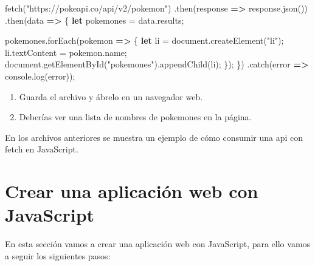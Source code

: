 \documentclass[
  a4paper,
  DIV=11,
  numbers=noendperiod,
  onepage,
  openany]{scrreprt}
\newenvironment{Shaded}{\begin{snugshade}}{\end{snugshade}}
\newcommand{\AttributeTok}[1]{\textcolor[rgb]{0.40,0.45,0.13}{#1}}
\newcommand{\BuiltInTok}[1]{\textcolor[rgb]{0.00,0.23,0.31}{#1}}
\newcommand{\FunctionTok}[1]{\textcolor[rgb]{0.28,0.35,0.67}{#1}}
\newcommand{\KeywordTok}[1]{\textcolor[rgb]{0.00,0.23,0.31}{\textbf{#1}}}
\newcommand{\NormalTok}[1]{\textcolor[rgb]{0.00,0.23,0.31}{#1}}
\newcommand{\OperatorTok}[1]{\textcolor[rgb]{0.37,0.37,0.37}{#1}}
\newcommand{\StringTok}[1]{\textcolor[rgb]{0.13,0.47,0.30}{#1}}
\begin{document}
\begin{tcolorbox}
\begin{Shaded}
\begin{Highlighting}[]
\FunctionTok{fetch}\NormalTok{(}\StringTok{"https://pokeapi.co/api/v2/pokemon"}\NormalTok{)}
    \OperatorTok{.}\FunctionTok{then}\NormalTok{(response }\KeywordTok{=\textgreater{}}\NormalTok{ response}\OperatorTok{.}\FunctionTok{json}\NormalTok{())}
    \OperatorTok{.}\FunctionTok{then}\NormalTok{(data }\KeywordTok{=\textgreater{}}\NormalTok{ \{}
        \KeywordTok{let}\NormalTok{ pokemones }\OperatorTok{=}\NormalTok{ data}\OperatorTok{.}\AttributeTok{results}\OperatorTok{;}

\NormalTok{        pokemones}\OperatorTok{.}\FunctionTok{forEach}\NormalTok{(pokemon }\KeywordTok{=\textgreater{}}\NormalTok{ \{}
            \KeywordTok{let}\NormalTok{ li }\OperatorTok{=} \BuiltInTok{document}\OperatorTok{.}\FunctionTok{createElement}\NormalTok{(}\StringTok{"li"}\NormalTok{)}\OperatorTok{;}
\NormalTok{            li}\OperatorTok{.}\AttributeTok{textContent} \OperatorTok{=}\NormalTok{ pokemon}\OperatorTok{.}\AttributeTok{name}\OperatorTok{;}
            \BuiltInTok{document}\OperatorTok{.}\FunctionTok{getElementById}\NormalTok{(}\StringTok{"pokemones"}\NormalTok{)}\OperatorTok{.}\FunctionTok{appendChild}\NormalTok{(li)}\OperatorTok{;}
\NormalTok{        \})}\OperatorTok{;}
\NormalTok{    \})}
    \OperatorTok{.}\FunctionTok{catch}\NormalTok{(error }\KeywordTok{=\textgreater{}} \BuiltInTok{console}\OperatorTok{.}\FunctionTok{log}\NormalTok{(error))}\OperatorTok{;}
\end{Highlighting}
\end{Shaded}

\begin{enumerate}
\def\labelenumi{\arabic{enumi}.}
\setcounter{enumi}{4}
\item
  Guarda el archivo y ábrelo en un navegador web.
\item
  Deberías ver una lista de nombres de pokemones en la página.
\end{enumerate}

En los archivos anteriores se muestra un ejemplo de cómo consumir una
api con fetch en JavaScript.

\section{Crear una aplicación web con
JavaScript}\label{crear-una-aplicaciuxf3n-web-con-javascript}

En esta sección vamos a crear una aplicación web con JavaScript, para
ello vamos a seguir los siguientes pasos:


\end{tcolorbox}
\end{document}
